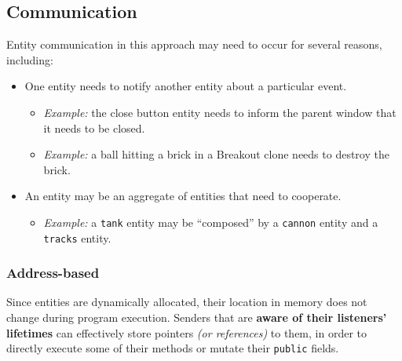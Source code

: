 \documentclass[twoside, 12pt, a4paper, openany]{book}
\providecommand{\tightlist}{%
  \setlength{\itemsep}{0pt}\setlength{\parskip}{0pt}}
\begin{document}
\hypertarget{chapter_oop_communication}{\subsection{Communication}\label{chapter_oop_communication}}

Entity communication in this approach may need to occur for several
reasons, including:

\begin{itemize}
\item
  One entity needs to notify another entity about a particular event.

  \begin{itemize}
  \item
    \emph{Example:} the close button entity needs to inform the parent
    window that it needs to be closed.
  \item
    \emph{Example:} a ball hitting a brick in a Breakout clone needs to
    destroy the brick.
  \end{itemize}
\item
  An entity may be an aggregate of entities that need to cooperate.

  \begin{itemize}
  \tightlist
  \item
    \emph{Example:} a
    \texttt{tank}
    entity may be ``composed'' by a
    \texttt{cannon}
    entity and a
    \texttt{tracks}
    entity.
  \end{itemize}
\end{itemize}

\subsubsection{Address-based}\label{address-based}

Since entities are dynamically allocated, their location in memory does
not change during program execution. Senders that are \textbf{aware of
their listeners' lifetimes} can effectively store pointers \emph{(or
references)} to them, in order to directly execute some of their methods
or mutate their
\texttt{public}
fields.
\end{document}
